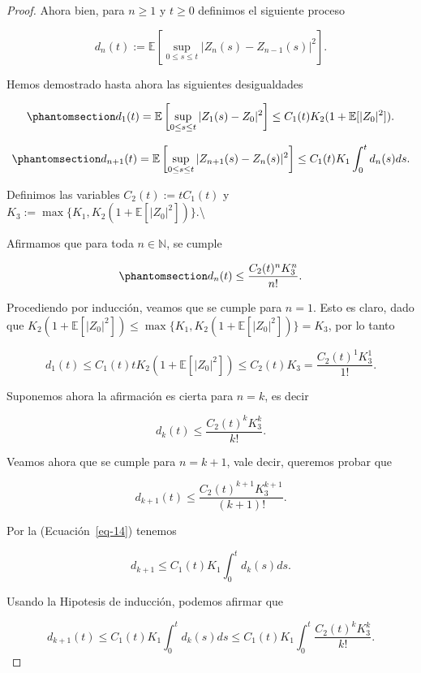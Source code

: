\documentclass[
  spanish,
  us-letterpaper,
]{scrreprt}
\theoremstyle{plain}
\theoremstyle{plain}
\theoremstyle{plain}
\theoremstyle{definition}
\theoremstyle{remark}
\begin{document}
\begin{proof}
Ahora bien, para \(n\geq 1\) y \(t\geq 0\) definimos el siguiente
proceso

\[
    d_n(t):= \mathbb{E}\left[\sup\limits_{0\leq s\leq t}|Z_n(s)-Z_{n-1}(s)|^2\right].
\]

Hemos demostrado hasta ahora las siguientes desigualdades

\begin{equation}\phantomsection\label{eq-13}{
    d_1(t) = \mathbb{E}\left[\sup\limits_{0\leq s\leq t}|Z_1(s)-Z_0|^2\right]\leq C_1(t)K_2(1+\mathbb{E}[|Z_0|^2]).
}\end{equation}

\begin{equation}\phantomsection\label{eq-14}{
    d_{n+1}(t) = \mathbb{E}\left[\sup\limits_{0\leq s\leq t}|Z_{n+1}(s)-Z_n(s)|^2\right]\leq C_1(t)K_1\int_0^t d_n(s)ds.
}\end{equation}

Definimos las variables \(C_2(t):=tC_1(t)\) y
\(K_3:=\max\{K_1,K_2(1+\mathbb{E}[|Z_0|^2])\}\).\textbackslash{}

Afirmamos que para toda \(n\in \mathbb{N}\), se cumple

\begin{equation}\phantomsection\label{eq-15}{
    d_n(t)\leq \frac{C_2(t)^n K_3^n}{n!}.
}\end{equation}

Procediendo por inducción, veamos que se cumple para \(n=1\). Esto es
claro, dado que
\(K_2(1+\mathbb{E}[|Z_0|^2])\leq \max\{K_1,K_2(1+\mathbb{E}[|Z_0|^2])\}=K_3\),
por lo tanto

\[
    d_1(t)\leq C_1(t)tK_2(1+\mathbb{E}[|Z_0|^2])\leq C_2(t)K_3 = \frac{C_2(t)^1 K_3^1}{1!}.
\]

Suponemos ahora la afirmación es cierta para \(n=k\), es decir

\[
    d_k(t)\leq \frac{C_2(t)^k K_3^k}{k!}.
\]

Veamos ahora que se cumple para \(n=k+1\), vale decir, queremos probar
que

\[
    d_{k+1}(t)\leq \frac{C_2(t)^{k+1} K_3^{k+1}}{(k+1)!}.
\]

Por la (Ecuación~\ref{eq-14}) tenemos

\[
        d_{k+1} \leq C_1(t)K_1\int_0^t d_k(s)ds.
\]

Usando la Hipotesis de inducción, podemos afirmar que

\[
    d_{k+1}(t) \leq C_1(t)K_1\int_0^t d_k(s)ds\leq C_1(t)K_1\int_0^t \frac{C_2(t)^kK_3^k}{k!}.
\]


\end{proof}
\end{document}
